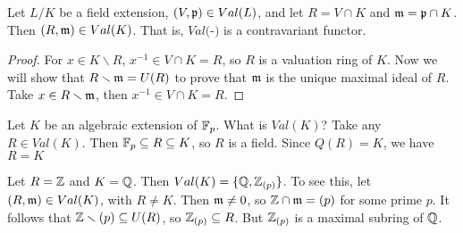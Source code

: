  \begin{proposition}
   Let $L/K$ be a field extension, $(V,\mathfrak{p})\in Val(L)$, and let $R=V\cap K$ and
   $\mathfrak{m}=\mathfrak{p}\cap K$. Then $(R,\mathfrak{m})\in Val(K)$. That is, $Val($-$)$ is a contravariant functor.
 \end{proposition}
 \begin{proof}
   For $x\in K\smallsetminus R$, $x^{-1}\in V\cap K=R$, so $R$ is a valuation ring of
   $K$. Now we will show that $R\smallsetminus \mathfrak{m} = U(R)$ to prove that $\mathfrak{m}$ is the
   unique maximal ideal of $R$. Take $x\in R\smallsetminus \mathfrak{m}$, then $x^{-1}\in V\cap
   K=R$.
 \end{proof}
 \begin{example}
   Let $K$ be an algebraic extension of $\mathbb{F}_p$. What is $Val(K)$? Take any $R\in
   Val(K)$. Then $\mathbb{F}_p\subseteq R \subseteq K$, so $R$ is a field. Since $Q(R)=K$, we
   have $R=K$
 \end{example}
 \begin{example}
   Let $R=\mathbb{Z}$ and $K=\mathbb{Q}$. Then $Val(K)=\{\mathbb{Q}, \mathbb{Z}_{(p)}\}$. To see this, let $(R,\mathfrak{m})\in
   Val(K)$, with $R\neq K$. Then $\mathfrak{m}\neq 0$, so $\mathbb{Z}\cap \mathfrak{m}=(p)$ for some prime $p$. It
   follows that $\mathbb{Z}\smallsetminus (p)\subseteq U(R)$, so $\mathbb{Z}_{(p)}\subseteq R$. But
   $\mathbb{Z}_{(p)}$ is a maximal subring of $\mathbb{Q}$.
 \end{example}
 
